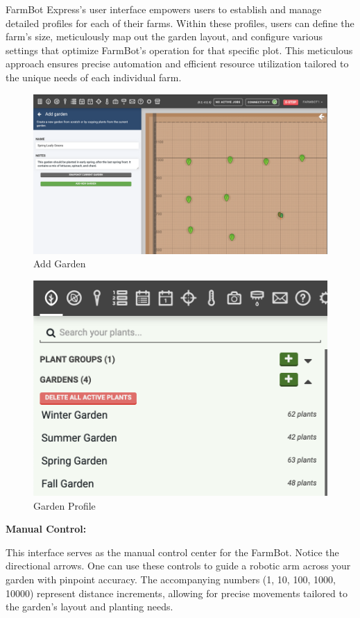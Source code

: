 \begin{itemize}
    FarmBot Express's user interface empowers users to establish and manage detailed profiles for each of their farms. Within these profiles, users can define the farm's size, meticulously map out the garden layout, and configure various settings that optimize FarmBot's operation for that specific plot. This meticulous approach ensures precise automation and efficient resource utilization tailored to the unique needs of each individual farm.

    \begin{figure}[H]
        \centering
        \includegraphics[width=0.5\linewidth]{Figures/ui_addgarden.png}
        \caption{Add Garden}
        \label{fig:garden}
    \end{figure}

    \begin{figure}[H]
        \centering
        \includegraphics[width=0.5\linewidth]{Figures/ui_viewgarden.png}
        \caption{Garden Profile}
        \label{fig:prof-garden}
    \end{figure}
    
    \textbf{Manual Control:}

    This interface serves as the manual control center for the FarmBot. Notice the directional arrows. One can use these controls to guide a robotic arm across your garden with pinpoint accuracy.  The accompanying numbers (1, 10, 100, 1000, 10000) represent distance increments, allowing for precise movements tailored to the garden's layout and planting needs.
    

\end{itemize}
